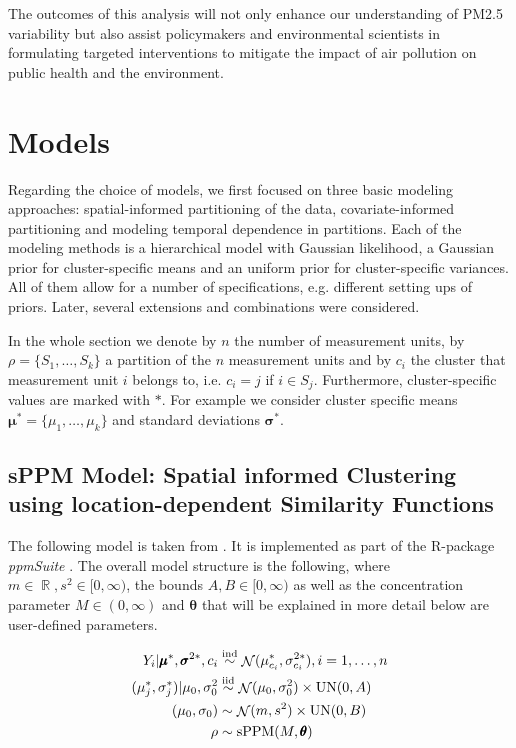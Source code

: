 \documentclass[12pt,a4paper]{article}
\DeclareMathOperator{\Normal}{\mathcal{N}}
\DeclareMathOperator{\sPPM}{\mathrm{sPPM}}
\DeclareMathOperator{\Uniform}{\mathrm{UN}}
\DeclareMathOperator{\RR}{\mathbb{R}}
\begin{document}
The outcomes of this analysis will not only enhance our understanding of PM2.5 variability but also assist policymakers and environmental scientists in formulating targeted interventions to mitigate the impact of air pollution on public health and the environment.


\section{Models}

Regarding the choice of models, we first focused on three basic modeling approaches: spatial-informed partitioning of the data, covariate-informed partitioning and modeling temporal dependence in partitions. Each of the modeling methods is a hierarchical model with Gaussian likelihood, a Gaussian prior for cluster-specific means and an uniform prior for cluster-specific variances. All of them allow for a number of specifications, e.g. different setting ups of priors. Later, several extensions and combinations were considered. \medskip

In the whole section we denote by $n$ the number of measurement units, by $\rho = \{ S_1, \dots, S_k \}$  a partition of the $n$ measurement units and by $c_i$ the cluster that measurement unit $i$ belongs to, i.e. $c_i = j$ if $i \in S_j$. Furthermore, cluster-specific values are marked with $*$. For example we consider cluster specific means $\pmb{\mu}^* = \{ \mu_1, \dots, \mu_k \}$ and standard deviations $\pmb{\sigma}^{*}$.

\subsection{sPPM Model: Spatial informed Clustering using location-dependent Similarity 
Functions} \label{sPPM-model}

The following model is taken from \cite{Page2016-Spatial}. It is implemented as part of the R-package \textit{ppmSuite} \cite{ppmSuite}.
The overall model structure is the following, where $m \in \RR, s^2 \in [0, \infty )$, the bounds $A, B \in [0, \infty)$ as well as the concentration parameter $M \in (0, \infty)$ and $\mathbf{\theta}$ that will be explained in more detail below are user-defined parameters.

\begin{align*}
    Y_i | \pmb{\mu}^*, \pmb{\sigma}^{2*}, c_i &\overset{\tiny{\mathrm{ind}}}{\sim} \Normal (\mu_{c_i}^*, \sigma_{c_i}^{2*}), i = 1, \dots, n \\
    (\mu_j^*, \sigma_j^*)  | \mu_0, \sigma_0^2 &\overset{\tiny{\mathrm{iid}}}{\sim} \Normal ( \mu_0, \sigma_0^2) \times \Uniform (0,A)\\
    (\mu_0, \sigma_0) &\sim \Normal (m, s^2) \times \Uniform (0,B)\\
    \rho &\sim \sPPM(M, \pmb{\theta})
\end{align*}
\end{document}
